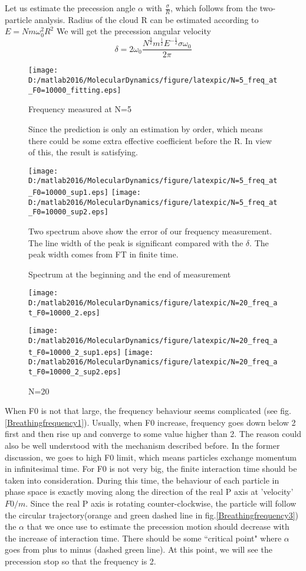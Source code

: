 \documentclass[aps,pre,twocolumn
,groupedaddress]{revtex4-1}
\begin{document}
Let us estimate the precession angle $\alpha$ with $\frac{\sigma}{R}$, which follows from the two-particle analysis. Radius of the cloud R can be estimated according to $E=Nm\omega_0^2R^2$
We will get the precession angular velocity 
\begin{equation}
\delta=2\omega_0\frac{N^\frac{3}{2}m^{\frac{1}{2}}E^{-\frac{1}{2}}\sigma\omega_0}{2\pi}
\label{eq:breathingfrequency1}
\end{equation}
\begin{figure}[hbtp]
\begin{center}
\texttt{[image: D:/matlab2016/MolecularDynamics/figure/latexpic/N=5\_freq\_at\_F0=10000\_fitting.eps]}
\caption{Frequency measured at N=5} 
Since the prediction is only an estimation by order, which means there could be some extra effective coefficient before the R. In view of this, the result is satisfying.

\texttt{[image: D:/matlab2016/MolecularDynamics/figure/latexpic/N=5\_freq\_at\_F0=10000\_sup1.eps]}
\texttt{[image: D:/matlab2016/MolecularDynamics/figure/latexpic/N=5\_freq\_at\_F0=10000\_sup2.eps]}
\caption{Spectrum at the beginning and the end of measurement}
\end{center}
 Two spectrum above show the error of our frequency measurement. The line width of the peak is significant compared with the $\delta$. The peak width comes from FT in finite time.
\end{figure}


\begin{figure}[hbtp]

\centering
\texttt{[image: D:/matlab2016/MolecularDynamics/figure/latexpic/N=20\_freq\_at\_F0=10000\_2.eps]}
\caption{N=20}
\texttt{[image: D:/matlab2016/MolecularDynamics/figure/latexpic/N=20\_freq\_at\_F0=10000\_2\_sup1.eps]}
\texttt{[image: D:/matlab2016/MolecularDynamics/figure/latexpic/N=20\_freq\_at\_F0=10000\_2\_sup2.eps]}
\end{figure}

When F0 is not that large, the frequency behaviour seems complicated (see fig.\ref{Breathingfrequency1}). Usually, when F0 increase, frequency goes down below 2 first and then rise up and converge to some value higher than 2. The reason could also be well understood with the mechanism described before. In the former discussion, we goes to high F0 limit, which means particles exchange momentum in infinitesimal time. For F0 is not very big, the finite interaction time should be taken into consideration. During this time, the behaviour of each particle in phase space is exactly moving along the direction of the real P axis at 'velocity' $F0/m$. Since the real P axis is rotating counter-clockwise, the particle will follow the circular trajectory(orange and green dashed line in fig.\ref{Breathingfrequency3}) the $\alpha$ that we once use to estimate the precession motion should decrease with the increase of interaction time. There should be some ``critical point" where $\alpha$ goes from plus to minus (dashed green line). At this point, we will see the precession stop so that the frequency is 2. 
 
\end{document}
